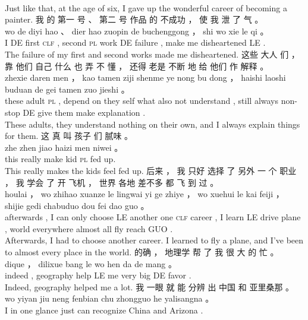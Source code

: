 \documentclass[UTF8]{ctexart}
\begin{document}
\begin{exe}
\\
\trans Just like that, at the age of six, I gave up the wonderful career of becoming a painter.
\ex
\glll
我 的 第一 号 、 第二 号 作品 的 不成功 ， 使 我 泄 了 气 。\\
wo de diyi hao 、 dier hao zuopin de buchenggong ， shi wo xie le qi 。
\\
I DE first \textsc{clf} , second \textsc{pl} work DE failure , make me disheartened LE {} .
\\
\trans The failure of my first and second works made me disheartened.
\ex
\glll
这些 大人 们 ， 靠 他们 自己 什么 也 弄 不 懂 ， 还得 老是 不断 地 给 他们 作 解释 。\\
zhexie daren men ， kao tamen ziji shenme ye nong bu dong ， haishi laoshi buduan de gei tamen zuo jieshi 。\\
these adult \textsc{pl} , {depend on} they self what also {} not understand , still always {non-stop} DE give them make explanation .
\\
\trans These adults, they understand nothing on their own, and I always explain things for them. 
\ex
\glll
这 真 叫 孩子 们 腻味 。\\
zhe zhen jiao haizi men niwei 。\\
this really make kid \textsc{pl} {fed up}.
\\
\trans This really makes the kids feel fed up. 
\ex
\glll
后来 ， 我 只好 选择 了 另外 一 个 职业 ， 我 学会 了 开 飞机 ， 世界 各地 差不多 都 飞 到 过 。
\\
houlai ， wo zhihao xuanze le lingwai yi ge zhiye ， wo xuehui le kai feiji ， shijie gedi chabuduo dou fei dao guo 。
\\
afterwards , I {can only} choose LE another one \textsc{clf} career , I learn LE drive plane , world everywhere almost all fly reach GUO .
\\
\trans Afterwards, I had to choose another career. I learned to fly a plane, and I've been to almost every place in the world. 
\ex
\glll
的确 ， 地理学 帮 了 我 很 大 的 忙 。
\\
dique ， dilixue bang le wo hen da de mang 。
\\
indeed , geography help LE me very big DE favor .
\\
\trans Indeed, geography helped me a lot. 
\ex
\glll
我 一眼 就 能 分辨 出 中国 和 亚里桑那 。
\\
wo yiyan jiu neng fenbian chu zhongguo he yalisangna 。
\\
I {in one glance} just can recognize China and Arizona .

\end{exe}
\end{document}
